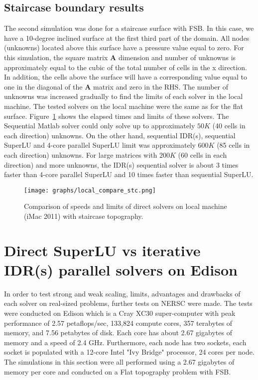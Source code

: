 \documentclass[12pt]{article}
\begin{document}
\subsection{Staircase boundary results}
The second simulation was done for a staircase surface with FSB. In this case, we have a 10-degree inclined surface at the first third part of the domain. All nodes (unknowns) located above this surface have a pressure value equal to zero. For this simulation, the square matrix $\mathbf{A}$ dimension and number of unknowns is approximately equal to the cubic of the total number of cells in the x direction. In addition, the cells above the surface will have a corresponding value equal to one in the diagonal of the $\mathbf{A}$ matrix and zero in the RHS. The number of unknowns was increased gradually to find the limits of each solver in the local machine. The tested solvers on the local machine were the same as for the flat surface. Figure~\ref{fig:local_compare_stc} shows the elapsed times and limits of these solvers. The Sequential Matlab solver could only solve up to approximately $50K$ (40 cells in each direction) unknowns. On the other hand, sequential IDR(s), sequential SuperLU and 4-core parallel SuperLU limit was approximately $600K$ (85 cells in each direction) unknowns. For large matrices with $200K$ (60 cells in each direction) and more unknowns, the IDR(s) sequential solver is about 3 times faster than 4-core parallel SuperLU and 10 times faster than sequential SuperLU.
\begin{figure}
	\centering
 \texttt{[image: graphs/local\_compare\_stc.png]}
  \caption{Comparison of speeds and limits of direct solvers on local machine (iMac 2011) with staircase topography.}
  \label{fig:local_compare_stc}
\end{figure}

\section{Direct SuperLU vs iterative IDR(s) parallel solvers on Edison}
In order to test strong and weak scaling, limits, advantages and drawbacks of each solver on real-sized problems, further tests on NERSC were made. The tests were conducted on Edison which is a Cray XC30 super-computer with peak performance of 2.57 petaflops/sec, 133,824 compute cores, 357 terabytes of memory, and 7.56 petabytes of disk. Each core has about 2.67 gigabytes of memory and a speed of 2.4 GHz. Furthermore, each node has two sockets, each socket is populated with a 12-core Intel "Ivy Bridge" processor, 24 cores per node. The simulations in this section were all performed using a 2.67 gigabytes of memory per core and conducted on a Flat topography problem with FSB.
\end{document}
